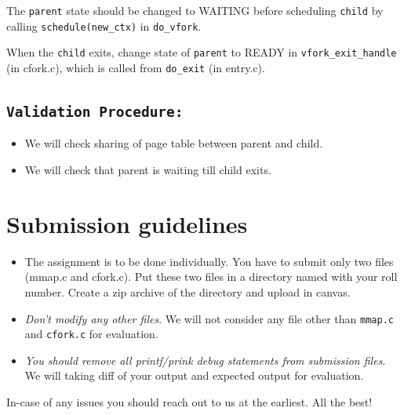 \documentclass[12pt]{article}
\begin{document}
The {\tt parent} state should be changed to WAITING before scheduling {\tt child} by calling {\tt schedule(new\_ctx)} in {\tt do\_vfork}.

When the {\tt child} exits, change state of {\tt parent} to READY in {\tt vfork\_exit\_handle} (in cfork.c), which is called from {\tt do\_exit} (in entry.c).
\subsection*{\tt Validation Procedure:}
     \begin{itemize}
     \item We will check sharing of page table between parent and child.
     \item We will check that parent is waiting till child exits.
     \end{itemize}

\section*{Submission guidelines}
\begin{itemize}
\item The assignment is to be done individually. You have to submit only two files (mmap.c and cfork.c). Put these two files in a directory named with your roll number. Create a zip archive of the directory and upload in canvas.
\item {\em Don't modify any other files}. We will not consider any file other than {\tt mmap.c} and {\tt cfork.c} for evaluation.
\item {\em You should remove all printf/prink debug statements from submission files}. We will taking diff of your output and expected output
for evaluation.
\end{itemize}


In-case of any issues you should reach out to us at the earliest.  All the best!
\end{document}
